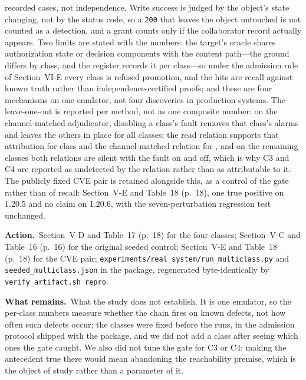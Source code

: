 \documentclass[10pt,letterpaper]{article}
\newcommand{\Action}[1]{\par\smallskip\noindent\textbf{Action.}\ #1\par}
\newcommand{\Remains}[1]{\par\smallskip\noindent\textbf{What remains.}\ #1\par}
\begin{document}
{recorded cases, not independence. Write success is judged by the object's state
changing, not by the status code, so a \texttt{200} that leaves the object
untouched is not counted as a detection, and a grant counts only if the
collaborator record actually appears. Two limits are stated with the numbers: the
target's oracle shares authorization state or decision components with the
content path---the ground differs by class, and the register records it per
class---so under the admission rule of Section~VI-E every class is refused
promotion, and the \McInstances{} hits are recall against known truth rather
than independence-certified proofs; and these are four mechanisms on one
emulator, not four discoveries in production systems. The leave-one-out is
reported per method, not as one composite number: on the channel-matched
adjudicator, disabling a class's fault removes that class's alarms and leaves
the others in place for all \McLooAdjudicatorClasses{} classes; the read
relation supports that attribution for \McLooReadClasses{} class and the
channel-matched relation for \McLooChannelClasses{}, and on the remaining
classes both relations are silent with the fault on and off, which is why C3 and
C4 are reported as undetected by the relation rather than as attributable to it. The
publicly fixed CVE pair is retained alongside this, as a
control of the gate rather than of recall: Section~V-E and Table~18 (p.~18), one
true positive on 1.20.5 and no claim on 1.20.6, with the seven-perturbation
regression test unchanged.}
\Action{Section~V-D and Table~17 (p.~18) for the four classes; Section~V-C and
Table~16 (p.~16) for the original seeded control; Section~V-E and Table~18
(p.~18) for the CVE pair; \texttt{experiments/real\_system/run\_multiclass.py}
and \texttt{seeded\_multiclass.json} in the package, regenerated
byte-identically by \texttt{verify\_artifact.sh repro}.}
\Remains{What the study does not establish. It is one emulator, so the per-class
numbers measure whether the chain fires on known defects, not how often such
defects occur; the classes were fixed before the runs, in the admission protocol
shipped with the package, and we did not add a class after seeing which ones the
gate caught. We also did not tune the gate for C3 or C4: making the antecedent
true there would mean abandoning the reachability premise, which is the object of
study rather than a parameter of it.}
\end{document}
